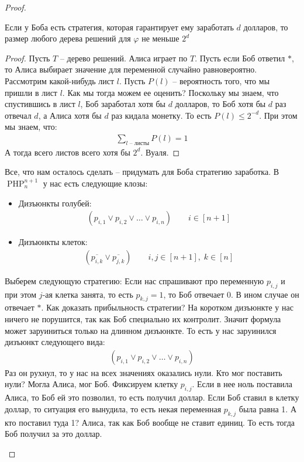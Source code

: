 \begin{proof}
\begin{enumerate}
        \begin{lemma}
            Если у Боба есть стратегия, которая гарантирует ему заработать $d$ долларов, то размер любого дерева решений для $\varphi$ не меньше $2^d$
        \end{lemma}
        \begin{proof}
            Пусть $T$ -- дерево решений. Алиса играет по $T$. Пусть если Боб ответил $*$, то Алиса выбирает значение для переменной случайно равновероятно. Рассмотрим какой-нибудь лист
            $l$. Пусть $P(l)$ -- вероятность того, что мы пришли в лист $l$. Как мы тогда можем ее оценить? Поскольку мы знаем, что спустившись в лист $l$, Боб заработал хотя бы $d$ долларов, 
            то Боб хотя бы $d$ раз отвечал $d$, а Алиса хотя бы $d$ раз кидала монетку. То есть $P(l) \leqslant 2^{-d}$. При этом мы знаем, что: 
            \begin{gather*}
                \sum\limits_{l \text{ -- листы}} P(l) = 1
            \end{gather*}
            А тогда всего листов всего хотя бы $2^d$. Вуаля. 
        \end{proof}
        Все, что нам осталось сделать -- придумать для Боба стратегию заработка. В $\operatorname{PHP}^{n+1}_n$ у нас есть следующие клозы: 
        \begin{itemize}
            \item Дизъюнкты голубей:
            \begin{gather*}
                (p_{i,1} \lor p_{i,2} \lor \dots \lor p_{i,n}) \qquad i \in [n + 1]
            \end{gather*} 
            \item Дизъюнкты клеток:
            \begin{gather*}
                (\overline{p_{i,k}} \lor \overline{p_{j,k}}) \qquad i,j \in [n + 1], \; k \in [n]
            \end{gather*} 
        \end{itemize}
        Выберем следующую стратегию: 
        Если нас спрашивают про переменную $p_{i,j}$ и при этом $j$-ая клетка занята, то есть $p_{k,j} = 1$, то Боб отвечает $0$. В ином случае он отвечает $*$. Как доказать прибыльность стратегии? 
        На коротком дизъюнкте у нас ничего не порушится, так как Боб специально их контролит. Значит формула может заруиниться только на длинном дизъюнкте. То есть у нас заруинился дизъюнкт следующего вида:
        \begin{gather*}
            (p_{i,1} \lor p_{i,2} \lor \dots \lor p_{i,n})
        \end{gather*}
        Раз он рухнул, то у нас на всех значениях оказались нули. Кто мог поставить нули? Могла Алиса, мог Боб. Фиксируем клетку $p_{i,j}$. Если 
        в нее ноль поставила Алиса, то Боб ей это позволил, то есть получил доллар. Если Боб ставил в клетку доллар, то ситуация его вынудила, то есть некая переменная $p_{k,j}$ была равна 1. А кто поставил туда 1? Алиса, так как Боб вообще не ставит единиц. 
        То есть тогда Боб получил за это доллар. 


\end{enumerate}
\end{proof}
